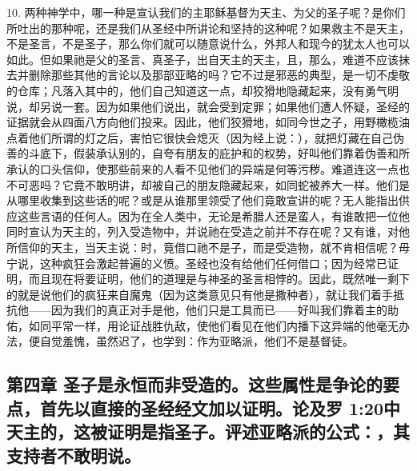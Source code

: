 10. 两种神学中，哪一种是宣认我们的主耶稣基督为天主、为父的圣子呢？是你们所吐出的那种呢，还是我们从圣经中所讲论和坚持的这种呢？如果救主不是天主，不是圣言，不是圣子，那么你们就可以随意说什么，外邦人和现今的犹太人也可以如此。但如果祂是父的圣言、真圣子，出自天主的天主，且，那么，难道不应该抹去并删除那些其他的言论以及那部亚略的吗？它不过是邪恶的典型，是一切不虔敬的仓库；凡落入其中的，他们自己知道这一点，却狡猾地隐藏起来，没有勇气明说，却另说一套。因为如果他们说出，就会受到定罪；如果他们遭人怀疑，圣经的证据就会从四面八方向他们投来。因此，他们狡猾地，如同今世之子，用野橄榄油点着他们所谓的灯之后，害怕它很快会熄灭（因为经上说：），就把灯藏在自己伪善的斗底下，假装承认别的，自夸有朋友的庇护和的权势，好叫他们靠着伪善和所承认的口头信仰，使那些前来的人看不见他们的异端是何等污秽。难道连这一点也不可恶吗？它竟不敢明讲，却被自己的朋友隐藏起来，如同蛇被养大一样。他们是从哪里收集到这些话的呢？或是从谁那里领受了他们竟敢宣讲的呢？无人能指出供应这些言语的任何人。因为在全人类中，无论是希腊人还是蛮人，有谁敢把一位他同时宣认为天主的，列入受造物中，并说祂在受造之前并不存在呢？又有谁，对他所信仰的天主，当天主说：时，竟借口祂不是子，而是受造物，就不肯相信呢？毋宁说，这种疯狂会激起普遍的义愤。圣经也没有给他们任何借口；因为经常已证明，而且现在将要证明，他们的道理是与神圣的圣言相悖的。因此，既然唯一剩下的就是说他们的疯狂来自魔鬼（因为这类意见只有他是撒种者），就让我们着手抵抗他——因为我们的真正对手是他，他们只是工具而已——好叫我们靠着主的助佑，如同平常一样，用论证战胜仇敌，使他们看见在他们内播下这异端的他毫无办法，便自觉羞愧，虽然迟了，也学到：作为亚略派，他们不是基督徒。\par


\subsection{第四章 圣子是永恒而非受造的。这些属性是争论的要点，首先以直接的圣经经文加以证明。论及罗 1:20中天主的，这被证明是指圣子。评述亚略派的公式：，其支持者不敢明说。}

